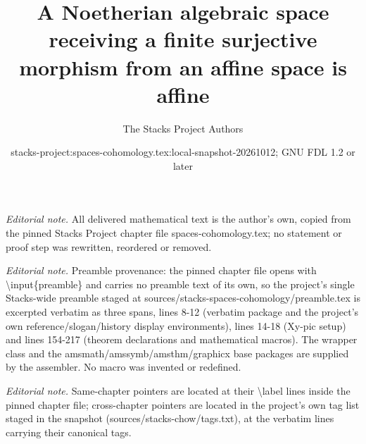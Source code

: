 \documentclass[10pt,a4paper]{amsart}
\title{A Noetherian algebraic space receiving a finite surjective morphism from an affine space is affine}
\author{The Stacks Project Authors}
\date{stacks-project:spaces-cohomology.tex:local-snapshot-20261012; GNU FDL 1.2 or later}
\theoremstyle{plain}
\theoremstyle{definition}
\theoremstyle{remark}
\numberwithin{equation}{subsection}
\begin{document}
\maketitle
\noindent\textit{Editorial note.} All delivered mathematical text is the author's own, copied from the pinned Stacks Project chapter file spaces-cohomology.tex; no statement or proof step was rewritten, reordered or removed.\par\medskip
\noindent\textit{Editorial note.} Preamble provenance: the pinned chapter file opens with \textbackslash{}input\{preamble\} and carries no preamble text of its own, so the project's single Stacks-wide preamble staged at sources/stacks-spaces-cohomology/preamble.tex is excerpted verbatim as three spans, lines 8-12 (verbatim package and the project's own reference/slogan/history display environments), lines 14-18 (Xy-pic setup) and lines 154-217 (theorem declarations and mathematical macros). The wrapper class and the amsmath/amssymb/amsthm/graphicx base packages are supplied by the assembler. No macro was invented or redefined.\par\medskip
\noindent\textit{Editorial note.} Same-chapter pointers are located at their \textbackslash{}label lines inside the pinned chapter file; cross-chapter pointers are located in the project's own tag list staged in the snapshot (sources/stacks-chow/tags.txt), at the verbatim lines carrying their canonical tags.\par\medskip
\end{document}

